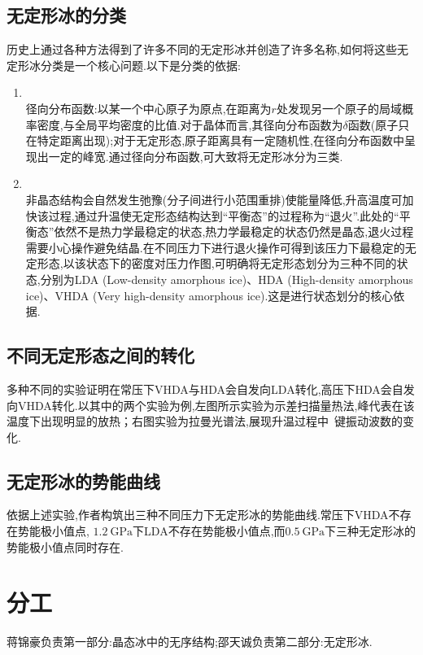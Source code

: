 \documentclass{ctexart}
\begin{document}
\subsection{无定形冰的分类}
历史上通过各种方法得到了许多不同的无定形冰并创造了许多名称,如何将这些无定形冰分类是一个核心问题.以下是分类的依据:
\begin{enumerate}
    \item {}\\
    径向分布函数:以某一个中心原子为原点,在距离为$r$处发现另一个原子的局域概率密度,与全局平均密度的比值.对于晶体而言,其径向分布函数为$\delta$函数(原子只在特定距离出现);对于无定形态,原子距离具有一定随机性,在径向分布函数中呈现出一定的峰宽.通过径向分布函数,可大致将无定形冰分为三类.
    \item {}\\
    非晶态结构会自然发生弛豫(分子间进行小范围重排)使能量降低,升高温度可加快该过程,通过升温使无定形态结构达到``平衡态''的过程称为``退火''.此处的``平衡态''依然不是热力学最稳定的状态,热力学最稳定的状态仍然是晶态,退火过程需要小心操作避免结晶.在不同压力下进行退火操作可得到该压力下最稳定的无定形态,以该状态下的密度对压力作图,可明确将无定形态划分为三种不同的状态,分别为LDA (Low-density amorphous ice)、HDA (High-density amorphous ice)、VHDA (Very high-density amorphous ice).这是进行状态划分的核心依据.
\end{enumerate}
\subsection{不同无定形态之间的转化}
多种不同的实验证明在常压下VHDA与HDA会自发向LDA转化,高压下HDA会自发向VHDA转化.以其中的两个实验为例,左图所示实验为示差扫描量热法,峰代表在该温度下出现明显的放热；右图实验为拉曼光谱法,展现升温过程中~键振动波数的变化.
\subsection{无定形冰的势能曲线}
依据上述实验,作者构筑出三种不同压力下无定形冰的势能曲线.常压下VHDA不存在势能极小值点, $\SI{1.2}{\giga\pascal}$下LDA不存在势能极小值点,而$\SI{0.5}{\giga\pascal}$下三种无定形冰的势能极小值点同时存在.
\section*{分工}
蒋锦豪负责第一部分:晶态冰中的无序结构;邵天诚负责第二部分:无定形冰.
\printbibliography[title={\Large 参考文献}]
\end{document}
